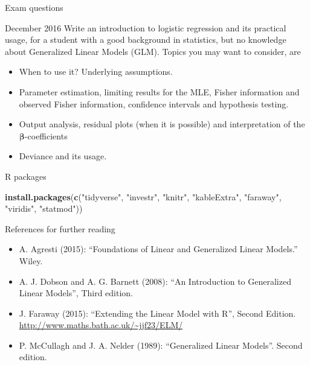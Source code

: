 \documentclass[
  ignorenonframetext,
]{beamer}
\newenvironment{Shaded}{\begin{snugshade}}{\end{snugshade}}
\newcommand{\FunctionTok}[1]{\textcolor[rgb]{0.13,0.29,0.53}{\textbf{#1}}}
\newcommand{\NormalTok}[1]{#1}
\newcommand{\StringTok}[1]{\textcolor[rgb]{0.31,0.60,0.02}{#1}}
\providecommand{\tightlist}{%
  \setlength{\itemsep}{0pt}\setlength{\parskip}{0pt}}
\begin{document}
\begin{frame}{Exam questions}
\begin{block}{December 2016}
Write an introduction to logistic regression and its practical usage,
for a student with a good background in statistics, but no knowledge
about Generalized Linear Models (GLM). Topics you may want to consider,
are

\begin{itemize}
\tightlist
\item
  When to use it? Underlying assumptions.
\item
  Parameter estimation, limiting results for the MLE, Fisher information
  and observed Fisher information, confidence intervals and hypothesis
  testing.
\item
  Output analysis, residual plots (when it is possible) and
  interpretation of the \(\boldsymbol{\beta}\)-coefficients
\item
  Deviance and its usage.
\end{itemize}
\end{block}
\end{frame}

\begin{frame}[fragile]{R packages}
\protect\hypertarget{r-packages}{}
\begin{Shaded}
\begin{Highlighting}[]
\FunctionTok{install.packages}\NormalTok{(}\FunctionTok{c}\NormalTok{(}\StringTok{"tidyverse"}\NormalTok{,}
                   \StringTok{"investr"}\NormalTok{,}
                   \StringTok{"knitr"}\NormalTok{,}
                   \StringTok{"kableExtra"}\NormalTok{,}
                   \StringTok{"faraway"}\NormalTok{,}
                   \StringTok{"viridis"}\NormalTok{,}
                   \StringTok{"statmod"}\NormalTok{))}
\end{Highlighting}
\end{Shaded}
\end{frame}

\begin{frame}{References for further reading}
\protect\hypertarget{references-for-further-reading}{}
\begin{itemize}
\tightlist
\item
  A. Agresti (2015): ``Foundations of Linear and Generalized Linear
  Models.'' Wiley.
\item
  A. J. Dobson and A. G. Barnett (2008): ``An Introduction to
  Generalized Linear Models'', Third edition.
\item
  J. Faraway (2015): ``Extending the Linear Model with R'', Second
  Edition. \url{http://www.maths.bath.ac.uk/~jjf23/ELM/}
\item
  P. McCullagh and J. A. Nelder (1989): ``Generalized Linear Models''.
  Second edition.
\end{itemize}
\end{frame}
\end{document}
